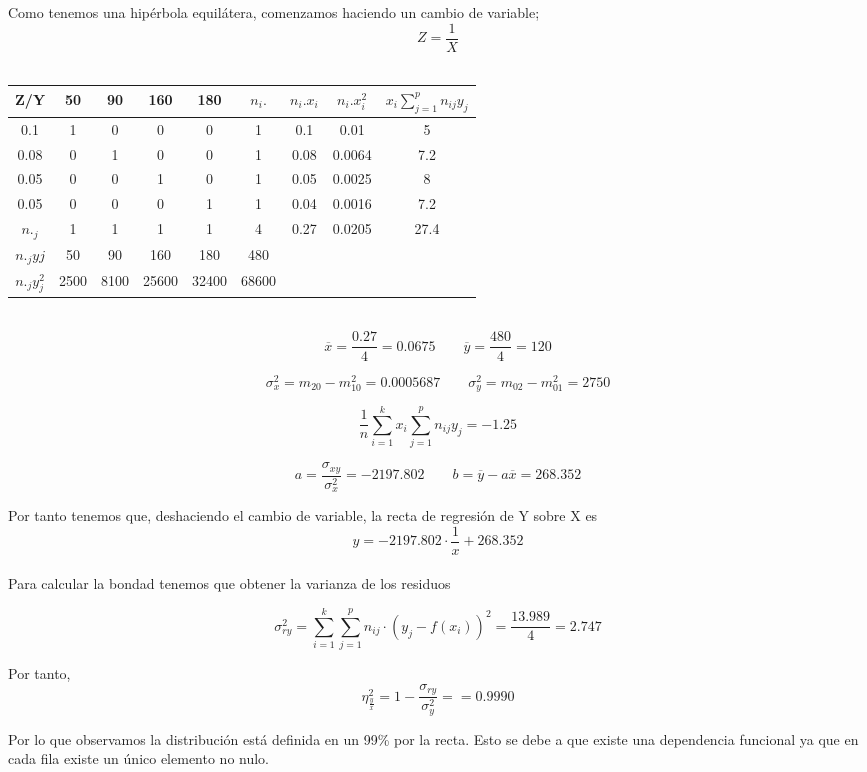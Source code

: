 \problem
Como tenemos una hipérbola equilátera, comenzamos haciendo un cambio de variable; $$Z = \dfrac{1}{X}$$ \\


\begin{tabular}{|c|c c c c|c|c|c|c|}
    \hline
    Z/Y  & 50 & 90 & 160 & 180 & $n_i.$ & $n_i.x_i$ & $n_i.x_i^2$ & $x_i\sum_{j=1}^p n_{ij} y_j$ \\ \hline
    0.1  & 1 & 0 & 0 & 0 & 1 & 0.1 & 0.01 & 5\\ 
    0.08 & 0 & 1 & 0 & 0 & 1 & 0.08 & 0.0064 & 7.2\\
    0.05 & 0 & 0 & 1 & 0 & 1 & 0.05 & 0.0025 & 8\\
    0.05 & 0 & 0 & 0 & 1 & 1 & 0.04 & 0.0016 & 7.2 \\ \hline
    $n._j$ & 1 & 1 & 1 & 1 & 4 & 0.27 & 0.0205 & 27.4 \\ \hline
    $n._jyj$ & 50 & 90 & 160 & 180 & 480 & & & \\ \hline
    $n._jy_j^2$ & 2500 &  8100 & 25600 & 32400 & 68600 & & & \\ \hline
\end{tabular}
\\


$$\overline{x} = \dfrac{0.27}{4} = 0.0675 \qquad \overline{y} = \dfrac{480}{4} = 120 $$

$$ \sigma_x^2 = m_{20} - m_{10}^2= 0.0005687 \qquad \sigma_y^2 = m_{02} - m_{01}^2= 2750 $$ 

$$\dfrac{1}{n}\sum_{i=1}^k x_i\sum_{j=1}^p n_{ij} y_j = -1.25$$

$$a = \dfrac{\sigma_{xy}}{\sigma_x^2} = -2197.802 \qquad b = \overline{y} - a\overline{x} = 268.352$$

Por tanto tenemos que, deshaciendo el cambio de variable, la recta de regresión de Y sobre X es $$y = -2197.802\cdot\dfrac{1}{x} + 268.352$$ \\

Para calcular la bondad tenemos que obtener la varianza de los residuos

$$\sigma_{ry}^2 = \sum_{i=1}^{k}\sum_{j=1}^p n_{ij}\cdot(y_j-f(x_i))^2 = \dfrac{13.989}{4} = 2.747 $$

Por tanto, 
$$\eta_{\frac{y}{x}}^2 = 1 - \dfrac{\sigma_{ry}}{\sigma_y^2} = = 0.9990$$


Por lo que observamos la distribución está definida en un 99\% por la recta. Esto se debe a que existe una dependencia funcional ya que en cada fila existe un único elemento no nulo. 
